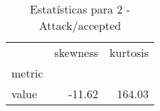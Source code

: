 \begin{table}[htbp]
\caption{Estatísticas para 2 - Attack/accepted}
\label{tab:2_-_attack_accepted_skewkurt}
\begin{tabular}{lrr}
\toprule
 & skewness & kurtosis \\
metric &  &  \\
\midrule
value & -11.62 & 164.03 \\
\bottomrule
\end{tabular}
\end{table}

